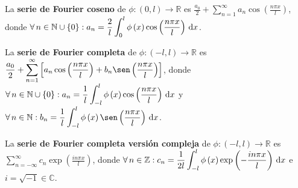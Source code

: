 \begin{definition}
    La \textbf{serie de Fourier coseno} de
    $\phi\colon\left(0,l\right)\to\mathbb{R}$ es
    \begin{math}\displaystyle
        \frac{a_{0}}{2}+
        \sum_{n=1}^{\infty}
        a_{n}
        \cos\left(\frac{n\pi x}{l}\right)
    \end{math},
    donde
    \begin{math}\displaystyle
        \forall n\in
        \mathbb{N}\cup\left\{0\right\}:
        a_{n}=
        \frac{2}{l}
        \int_{0}^{l}
        \phi\left(x\right)
        \cos\left(\frac{n\pi x}{l}\right)
        \dl x
    \end{math}.
\end{definition}

\begin{definition}
    La \textbf{serie de Fourier completa} de
    $\phi\colon\left(-l,l\right)\to\mathbb{R}$ es\linebreak
    \begin{math}\displaystyle
        \frac{a_{0}}{2}+
        \sum_{n=1}^{\infty}
        \left[
            a_{n}
            \cos\left(\frac{n\pi x}{l}\right)+
            b_{n}
            \sen
            \left(\frac{n\pi x}{l}\right)
            \right]
    \end{math},
    donde
    \begin{math}\displaystyle
        \forall n\in
        \mathbb{N}\cup\left\{0\right\}:
        a_{n}=
        \frac{1}{l}
        \int_{-l}^{l}
        \phi\left(x\right)
        \cos\left(\frac{n\pi x}{l}\right)
        \dl x
    \end{math}
    y
    \begin{math}\displaystyle
        \forall n\in
        \mathbb{N}:
        b_{n}=
        \frac{1}{l}
        \int_{-l}^{l}
        \phi\left(x\right)
        \sen
        \left(\frac{n\pi x}{l}\right)
        \dl x
    \end{math}.
\end{definition}

\begin{definition}
    La \textbf{serie de Fourier completa versión compleja} de
    $\phi\colon\left(-l,l\right)\to\mathbb{R}$ es
    \begin{math}\displaystyle
        \sum_{n=-\infty}^{\infty}
        c_{n}
        \exp\left(\frac{in\pi x}{l}\right)
    \end{math},
    donde
    \begin{math}\displaystyle
        \forall n\in
        \mathbb{Z}:
        c_{n}=
        \frac{1}{2l}
        \int_{-l}^{l}
        \phi\left(x\right)
        \exp\left(-\frac{in\pi x}{l}\right)
        \dl x
    \end{math}
    e $i=\sqrt{-1}\in\mathbb{C}$.
\end{definition}


